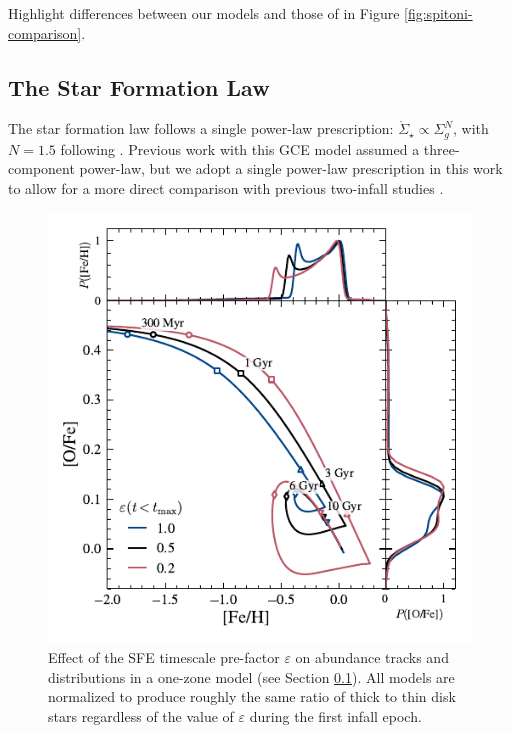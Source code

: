 \documentclass[twocolumn,twocolappendix,linenumbers]{aastex631}
\newcommand{\todo}[1]{{\color{red}#1}}
\begin{document}
\todo{Highlight differences between our models and those of \citet{spitoni_apogee_2021} in Figure \ref{fig:spitoni-comparison}.} 

\subsection{The Star Formation Law}
\label{sec:sf-law}

The star formation law follows a single power-law prescription: $\dot\Sigma_\star\propto\Sigma_g^N$, with $N=1.5$ following \citet{kennicutt_global_1998}. Previous work with this GCE model \citep[e.g.,][]{johnson_stellar_2021,dubay_galactic_2024} assumed a three-component power-law, but we adopt a single power-law prescription in this work to allow for a more direct comparison with previous two-infall studies \citep[e.g.,][]{spitoni_remind_2024}. 

\begin{figure}
    \centering
    \includegraphics{src/tex/figures/sfe_prefactor.pdf}
    \caption{Effect of the SFE timescale pre-factor $\varepsilon$ on abundance tracks and distributions in a one-zone model (see Section \ref{sec:sf-law}). All models are normalized to produce roughly the same ratio of thick to thin disk stars regardless of the value of $\varepsilon$ during the first infall epoch.}
    \label{fig:sfe-prefactor}
\end{figure}
\end{document}
